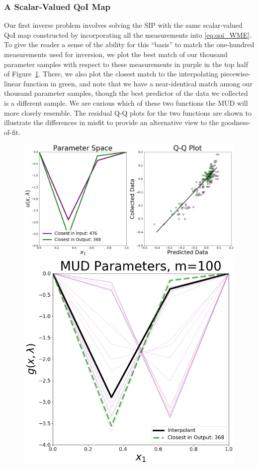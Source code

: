 \subsubsection{A Scalar-Valued QoI Map}

Our first inverse problem involves solving the SIP with the same scalar-valued QoI map constructed by incorporating all the measurements into \eqref{eq:qoi_WME}.
To give the reader a sense of the ability for this ``basis'' to match the one-hundred measurements used for inversion, we plot the best match of our thousand parameter samples with respect to these measurements in purple in the top half of Figure~\ref{fig:pde-highd-2d-scalar-mud}.
There, we also plot the closest match to the interpolating piecewise-linear function in green, and note that we have a near-identical match among our thousand parameter samples, though the best predictor of the data we collected is a different sample.
We are curious which of these two functions the MUD will more closely resemble.
The residual Q-Q plots for the two functions are shown to illustrate the differences in misfit to provide an alternative view to the goodness-of-fit.


\begin{figure}
\centering
  \includegraphics[width=0.95\linewidth]{figures/pde-highd/pde-highd_proj_D2.png}
  \includegraphics[width=0.95\linewidth]{figures/pde-highd/pde-highd_pair_D2-1_m100.png}
\caption{
}
\label{fig:pde-highd-2d-scalar-mud}
\end{figure}


